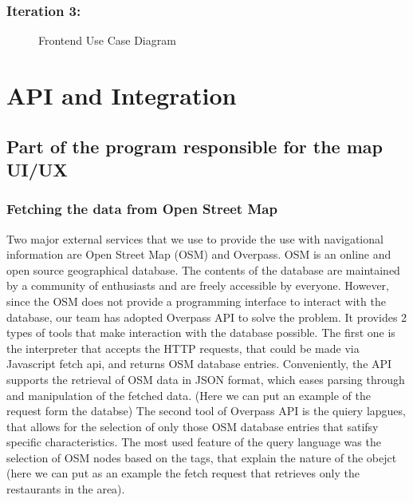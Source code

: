 \subsubsection{Iteration 3:}

\begin{figure}[h]
    \centering
    \caption{Frontend Use Case Diagram}
    \label{fig:frontend_usecase}
\end{figure}

\section{API and Integration}
\subsection{Part of the program responsible for the map UI/UX}

\subsubsection{Fetching the data from Open Street Map }

Two major external services that we use to provide the use with navigational information are Open Street Map (OSM) and Overpass. OSM is an online and open source geographical database. The contents of the database are maintained by a community of enthusiasts and are freely accessible by everyone. However,  since the OSM does not provide a programming interface to interact with the database, our team has adopted Overpass API to solve the problem. It provides 2 types of tools that make interaction with the database possible. The first one is the interpreter that accepts the HTTP requests, that could be made via Javascript fetch api, and returns OSM database entries. Conveniently, the API supports the retrieval of OSM data in JSON format, which eases parsing through and manipulation of the fetched data. (Here we can put an example of the request form the databse) The second tool of Overpass API is the quiery lapgues, that allows for the selection of only those OSM database entries that satifsy specific characteristics. The most used feature of the query language was the selection of OSM nodes based on the tags, that explain the nature of the obejct (here we can put as an example the fetch request that retrieves only the restaurants in the area). 

